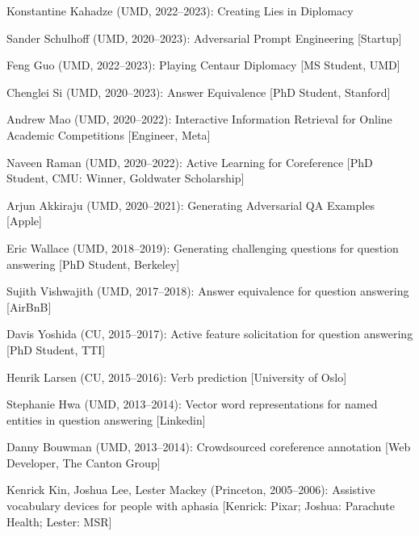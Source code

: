 \begin{enumerate*}
      \item Konstantine Kahadze (UMD, 2022--2023): Creating Lies in
      Diplomacy
    \item Sander Schulhoff (UMD, 2020--2023): Adversarial Prompt
      Engineering [Startup]      
    \item Feng Guo (UMD, 2022--2023): Playing Centaur Diplomacy [MS Student, UMD]
  \item Chenglei Si (UMD, 2020--2023): Answer Equivalence [PhD Student, Stanford]        
    \item Andrew Mao (UMD, 2020--2022): Interactive Information Retrieval
      for Online Academic Competitions    [Engineer, Meta]
    \item Naveen Raman (UMD, 2020--2022): Active Learning for Coreference [PhD Student, CMU: Winner, Goldwater Scholarship]
    \item Arjun Akkiraju (UMD, 2020--2021): Generating Adversarial QA Examples     [Apple]
  \item Eric Wallace (UMD, 2018--2019): Generating challenging questions for
    question answering [PhD Student, Berkeley]
  \item Sujith Vishwajith (UMD, 2017--2018): Answer equivalence for question answering [AirBnB]
  \item Davis Yoshida (CU, 2015--2017): Active feature solicitation for question answering [PhD Student, TTI]
  \item Henrik Larsen (CU, 2015--2016): Verb prediction [University of Oslo]
  \item Stephanie Hwa (UMD, 2013--2014): Vector word representations for named entities in question answering [Linkedin]
  \item Danny Bouwman (UMD, 2013--2014): Crowdsourced coreference annotation [Web Developer, The Canton Group]
  \item Kenrick Kin, Joshua Lee, Lester Mackey (Princeton, 2005--2006): Assistive vocabulary devices
    for people with aphasia [Kenrick: Pixar; Joshua: Parachute Health; Lester: MSR]
\end{enumerate*}
